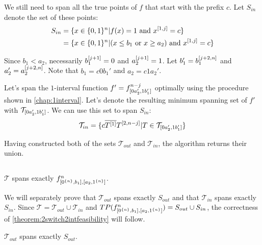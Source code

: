 \begin{description}
We still need to span all the true points of $f$
that start with the prefix $c$.
Let $S_{in}$ denote the set of these points:
\begin{align*}
S_{in}
&= \{x \in \{0, 1\}^n
| f(x) = 1 \text{ and } x^{[1, j]} = c\} \\
&= \{x \in \{0, 1\}^n
| (x \leq b_1 \text{ or } x \geq a_2) \text{ and } x^{[1, j]} = c\}
\end{align*}

Since $b_1 < a_2$,
necessarily $b_1^{[j+1]} = 0$ and $a_2^{[j+1]} = 1$.
Let $b_1' = b_1^{[j+2, n]}$
and $a_2' = a_2^{[j+2, n]}$.
Note that $b_1 = c 0 b_1'$ and $a_2 = c 1 a_2'$.

Let's span the $1$-interval function
$f' = f^{n-j}_{[0 a_2', 1 b_1']}$
optimally using the procedure shown in \cref{chap:1interval}.
Let's denote the resulting minimum spanning set of $f'$
with $\mathcal{T}_{[0 a_2', 1 b_1']}$.
We can use this set to span $S_{in}$:
$$
\mathcal{T}_{in} =
\{c \overline{T^{[1]}} T^{[2, n-j]}
| T \in \mathcal{T}_{[0 a_2', 1 b_1']}\}
$$

Having constructed both of the sets
$\mathcal{T}_{out}$ and $\mathcal{T}_{in}$,
the algorithm returns their union.
\end{description}

\subsection{\titlefeasibility}

\begin{theorem}
\label{theorem:2switch2intfeasibility}
$\mathcal{T}$ spans exactly $f^{n}_{[0^{\{n\}}, b_1], [a_2, 1^{\{n\}}]}$.
\end{theorem}

We will separately prove that $\mathcal{T}_{out}$ spans exactly $S_{out}$
and that $\mathcal{T}_{in}$ spans exactly $S_{in}$.
Since $\mathcal{T} = \mathcal{T}_{out} \cup \mathcal{T}_{in}$
and $TP(f^{n}_{[0^{\{n\}}, b_1], [a_2, 1^{\{n\}}]}) = S_{out} \cup S_{in}$,
the correctness of
\cref{theorem:2switch2intfeasibility} will follow.

\begin{lemma}
$\mathcal{T}_{out}$ spans exactly $S_{out}$.
\end{lemma}

